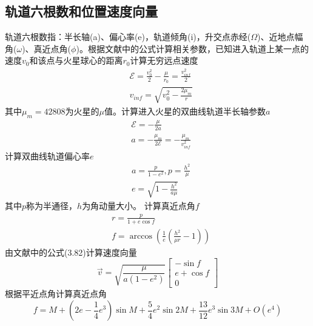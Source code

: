\subsection{轨道六根数和位置速度向量}
轨道六根数指：半长轴(a)、偏心率(e)，轨道倾角(i)，升交点赤经($\Omega$)、近地点幅角($\omega$)、真近点角($\phi$)。根据文献\cite{bruiter2012}中的公式计算相关参数，已知进入轨道上某一点的速度$v_0$和该点与火星球心的距离$r_0$计算无穷远点速度
\[\begin{aligned}
    &\mathcal{E}=\frac{v_0^2}{2}-\frac{\mu}{r_0} = \frac{v_{inf}^2}{2} \\
    &v_{inf}=\sqrt{v_0^2-\frac{2\mu_m}{r}}
\end{aligned}\]
其中$\mu_m=42808$为火星的$\mu$值。计算进入火星的双曲线轨道半长轴参数$a$
\[\begin{aligned}
    &\mathcal{E}=-\frac{\mu}{2a} \\
    &a=-\frac{\mu_m}{2\mathcal{E}}=-\frac{\mu_m}{v_{inf}^2}
\end{aligned}\]
计算双曲线轨道偏心率$e$
\[\begin{aligned}
    &a=\frac{p}{1-e^2},p=\frac{h^2}{\mu} \\
    &e=\sqrt{1-\frac{h^2}{a\mu}}
\end{aligned}\]
其中$p$称为半通径，$h$为角动量大小。
计算真近点角$f$
\[\begin{aligned}
    &r=\frac{p}{1+e\cos f} \\
    &f=\arccos(\frac{1}{e}(\frac{h^2}{\mu r}-1))
\end{aligned}\]
由文献\cite{bruiter2012}中的公式(3.82)计算速度向量
\[
    \vec{v}=\sqrt{\frac{\mu}{a(1-e^2)}}
    \left[\begin{matrix}
        -\sin f \\ e+\cos f \\ 0
    \end{matrix}\right]
\]
根据平近点角计算真近点角\cite{bsmart1977}
\[
    f=M+\left(2e-{\frac {1}{4}}e^{3}\right)\sin {M}
    +{\frac {5}{4}}e^{2}\sin {2M}+{\frac {13}{12}}e^{3}\sin {3M}+O(e^{4})
\]
